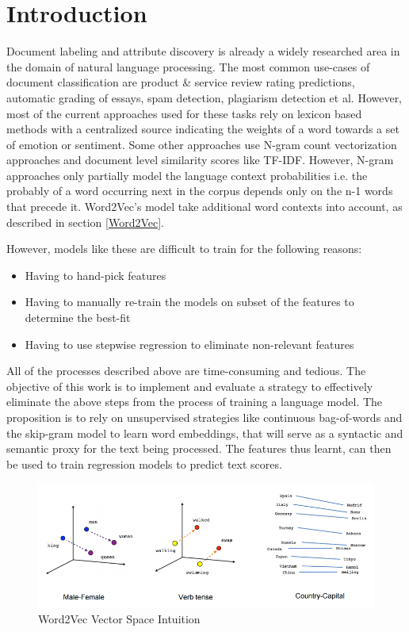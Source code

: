\documentclass[conference]{IEEEtran}
\begin{document}
\section{Introduction}
Document labeling and attribute discovery is already a widely researched area in the domain of natural language processing. The most common use-cases of document classification are product \& service review rating predictions, automatic grading of essays, spam detection, plagiarism detection et al. However, most of the current approaches used for these tasks rely on lexicon based methods with a centralized source indicating the weights of a word towards a set of emotion or sentiment. Some other approaches use N-gram count vectorization approaches and document level similarity scores like TF-IDF. However, N-gram approaches only partially model the language context probabilities i.e. the probably of a word occurring next in the corpus depends only on the n-1 words that precede it. Word2Vec's model take additional word contexts into account, as described in section \ref{Word2Vec}.

However, models like these are difficult to train for the following reasons:
\begin{itemize}
  \item Having to hand-pick features
  \item Having to manually re-train the models on subset of the features to determine the best-fit
  \item Having to use stepwise regression to eliminate non-relevant features
\end{itemize}

All of the processes described above are time-consuming and tedious. The objective of this work is to implement and evaluate a strategy to effectively eliminate the above steps from the process of training a language model. The proposition is to rely on unsupervised strategies like continuous bag-of-words and the skip-gram model to learn word embeddings, that will serve as a syntactic and semantic proxy for the text being processed. The features thus learnt, can then be used to train regression models to predict text scores.


\begin{figure}[ht]
\centering
\includegraphics[width=\textwidth]{images/word2vec_1.png}
\caption{Word2Vec Vector Space Intuition\cite{tensorflow_word2vec}}
\label{fig:word2vec-vectorspace-intuition}
\end{figure}
\end{document}
